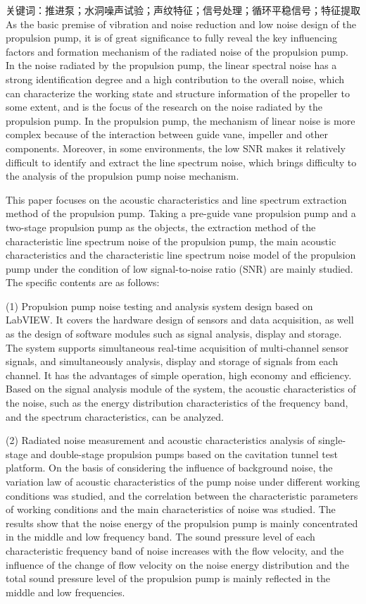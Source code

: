 关键词：推进泵；水洞噪声试验；声纹特征；信号处理；循环平稳信号；特征提取
\cleardoublepage
{}
As the basic premise of vibration and noise reduction and low noise design of the propulsion pump, 
it is of great significance to fully reveal the key influencing factors and formation mechanism of the radiated noise of the propulsion pump. 
In the noise radiated by the propulsion pump, the linear spectral noise has a strong identification degree and a high contribution to the overall noise, 
which can characterize the working state and structure information of the propeller to some extent, 
and is the focus of the research on the noise radiated by the propulsion pump. 
In the propulsion pump, the mechanism of linear noise is more complex because of the interaction between guide vane, impeller and other components.
Moreover, in some environments, the low SNR makes it relatively difficult to identify and extract the line spectrum noise, 
which brings difficulty to the analysis of the propulsion pump noise mechanism.

This paper focuses on the acoustic characteristics and line spectrum extraction method of the propulsion pump. 
Taking a pre-guide vane propulsion pump and a two-stage propulsion pump as the objects, 
the extraction method of the characteristic line spectrum noise of the propulsion pump, 
the main acoustic characteristics and the characteristic line spectrum noise model of the propulsion pump under the condition of low signal-to-noise ratio (SNR) are mainly studied. 
The specific contents are as follows:

(1) Propulsion pump noise testing and analysis system design based on LabVIEW.
It covers the hardware design of sensors and data acquisition, 
as well as the design of software modules such as signal analysis, display and storage.
The system supports simultaneous real-time acquisition of multi-channel sensor signals, 
and simultaneously analysis, display and storage of signals from each channel. 
It has the advantages of simple operation, high economy and efficiency. 
Based on the signal analysis module of the system, 
the acoustic characteristics of the noise, such as the energy distribution characteristics of the frequency band, and the spectrum characteristics, can be analyzed.

(2) Radiated noise measurement and acoustic characteristics analysis
 of single-stage and double-stage propulsion pumps based on the cavitation tunnel test platform. 
 On the basis of considering the influence of background noise, 
 the variation law of acoustic characteristics of the pump noise under different working conditions was studied, 
 and the correlation between the characteristic parameters of working conditions and the main characteristics of noise was studied. 
 The results show that the noise energy of the propulsion pump is mainly concentrated in the middle and low frequency band. 
 The sound pressure level of each characteristic frequency band of noise increases with the flow velocity, 
 and the influence of the change of flow velocity on the noise energy distribution and the total sound pressure level of the propulsion pump is mainly reflected in the middle and low frequencies.

